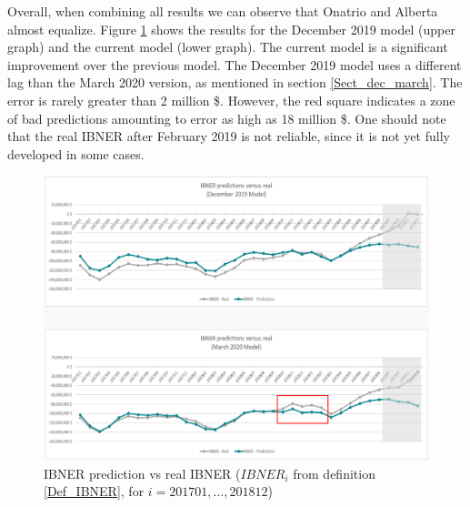 	Overall, when combining all results we can observe that Onatrio and Alberta almost equalize. Figure \ref{Fig_IBNER_preds} shows the results for the December 2019 model (upper graph) and the current model (lower graph). The current model is a significant improvement over the previous model. The December 2019 model uses a different lag than the March 2020 version, as mentioned in section \ref{Sect_dec_march}. The error is rarely greater than 2 million \$. However, the red square indicates a zone of bad predictions amounting to error as high as 18 million \$. One should note that the real IBNER after February 2019 is not reliable, since it is not yet fully developed in some cases.
	
	\begin{figure}[H]
		\begin{center}
			\includegraphics[scale=0.4]{Graphiques/JAN_vs_MARCH} 
			\renewcommand{\figurename}{Figure}
			\caption[IBNER prediction vs real IBNER]{IBNER prediction vs real IBNER ($IBNER_i$ from definition \ref{Def_IBNER}, for $i= 201701,\dots,201812$)}\label{Fig_IBNER_preds}
		\end{center}
	\end{figure}

